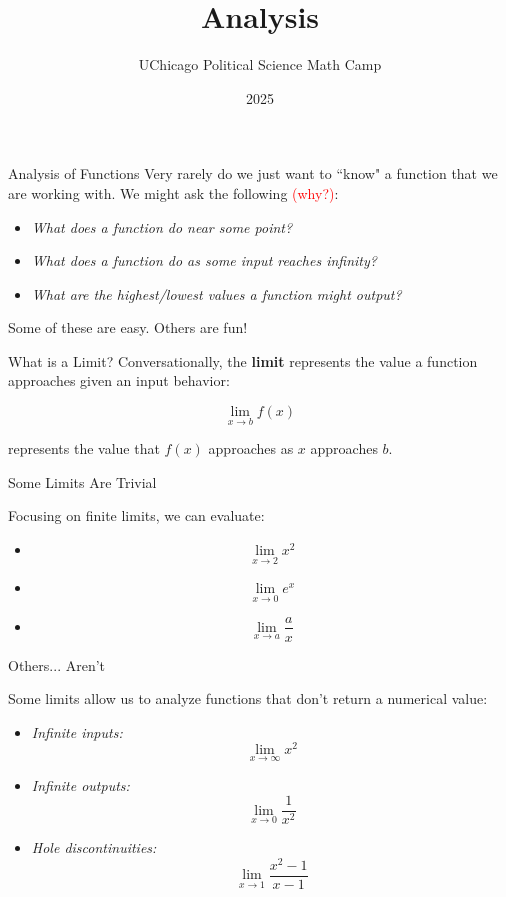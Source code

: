 \documentclass[10pt]{beamer}
\title{Analysis}
\author{UChicago Political Science Math Camp}
\institute{Ryan Gibbons \& Luke Cain}
\date{2025}
\begin{document}
\frame{\titlepage}


\begin{frame}{Analysis of Functions}
Very rarely do we just want to ``know" a function that we are working with. We might ask the following \textcolor{red}{(why?)}:
\vspace{.2cm}
\begin{itemize}
    \item \textit{What does a function do near some point?}
    \item \textit{What does a function do as some input reaches infinity?}
    \item \textit{What are the highest/lowest values a function might output?}
\end{itemize}
\vspace{.5cm}
Some of these are easy. Others are fun!

\end{frame}


\begin{frame}{What is a Limit?}
    Conversationally, the \textbf{limit} represents the value a function approaches given an input behavior:

    \[\lim_{x \to b} f(x)\]

    represents the value that $f(x)$ approaches as $x$ approaches $b$. 
    
\end{frame}


\begin{frame}{Some Limits Are Trivial}

Focusing on finite limits, we can evaluate:

\begin{itemize}
    \item \[\lim_{x \to 2} x^2\] \pause
    \item \[\lim_{x \to 0} e^x\] \pause
    \item \[\lim_{x \to a}\frac{a}{x}\]
\end{itemize}
\end{frame}

\begin{frame}{Others... Aren't}

Some limits allow us to analyze functions that don't return a numerical value:

\begin{itemize}
    \item \textit{Infinite inputs:}
    \[\lim_{x \to \infty} x^2\]
    \pause
    \item \textit{Infinite outputs:}
    \[\lim_{x \to 0}\frac{1}{x^2}\]
    \pause
    \item \textit{Hole discontinuities:}
    \[\lim_{x \to 1} \frac{x^2 - 1}{x - 1}\]
\end{itemize}
    
\end{frame}
\end{document}
